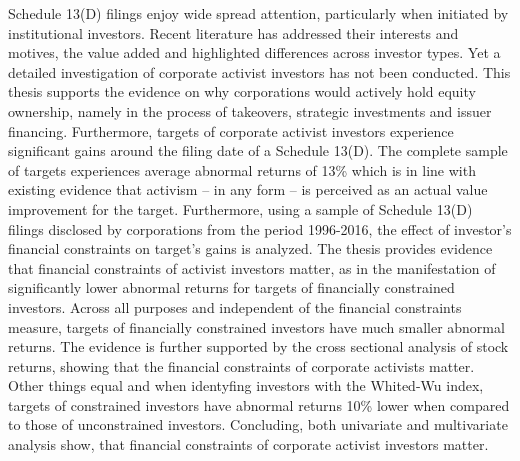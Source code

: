 \documentclass[12pt]{article}
\newcounter{savepage}
\begin{document}
Schedule 13(D) filings enjoy wide spread attention, particularly when initiated by institutional investors. Recent literature has addressed their interests and motives, the value added and highlighted differences across investor types. Yet a detailed investigation of corporate activist investors has not been conducted. This thesis supports the evidence on why corporations would actively hold equity ownership, namely in the process of takeovers, strategic investments and issuer financing. Furthermore, targets of corporate activist investors experience significant gains around the filing date of a Schedule 13(D). The complete sample of targets experiences average abnormal returns of 13\% which is in line with existing evidence that activism -- in any form -- is perceived as an actual value improvement for the target. 
Furthermore, using a sample of Schedule 13(D) filings disclosed by corporations from the period 1996-2016, the effect of investor's financial constraints on target's gains is analyzed. The thesis provides evidence that financial constraints of activist investors matter, as in the manifestation of significantly lower abnormal returns for targets of financially constrained investors. Across all purposes and independent of the financial constraints measure, targets of financially constrained investors have much smaller abnormal returns. The evidence is further supported by the cross sectional analysis of stock returns, showing that the financial constraints of corporate activists matter. Other things equal and when identyfing investors with the Whited-Wu index, targets of constrained investors have abnormal returns 10\% lower when compared to those of unconstrained investors.
Concluding, both univariate and multivariate analysis show, that financial constraints of corporate activist investors matter.
\pagebreak
\cleardoublepage
{}
\setcounter{page}{\thesavepage}
\end{document}
